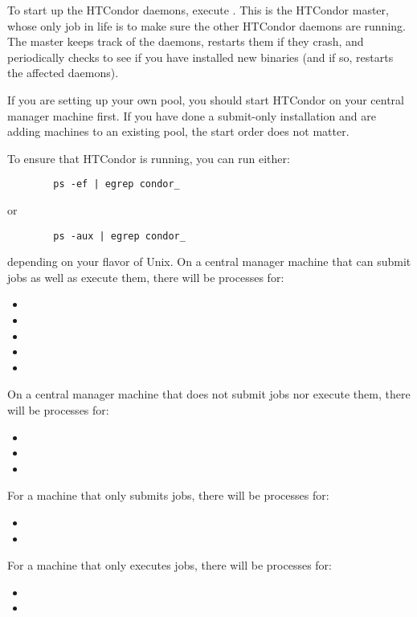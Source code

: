 To start up the HTCondor daemons, execute
.  This is the HTCondor master, whose
only job in life is to make sure the other HTCondor daemons are running.
The master keeps track of the daemons, restarts them if they crash,
and periodically checks to see if you have installed new binaries (and
if so, restarts the affected daemons).

If you are setting up your own pool, you should start HTCondor on your
central manager machine first.  If you have done a submit-only
installation and are adding machines to an existing pool,
the start order does not
matter.

To ensure that HTCondor is running, you can run either:
\begin{verbatim}
        ps -ef | egrep condor_
\end{verbatim}
or
\begin{verbatim}
        ps -aux | egrep condor_
\end{verbatim}
depending on your flavor of Unix.  
On a central manager machine that can submit jobs as well
as execute them, there will be processes for:
\begin{itemize}
	\item {}
	\item {}
	\item {}
	\item {}
	\item {}
\end{itemize}
On a central manager machine that does not submit jobs nor
execute them, there will be processes for:
\begin{itemize}
	\item {}
	\item {}
	\item {}
\end{itemize}
For a machine that only submits jobs, there will be processes for:
\begin{itemize}
	\item {}
	\item {}
\end{itemize}
For a machine that only executes jobs, there will be processes for:
\begin{itemize}
	\item {}
	\item {}
\end{itemize}

